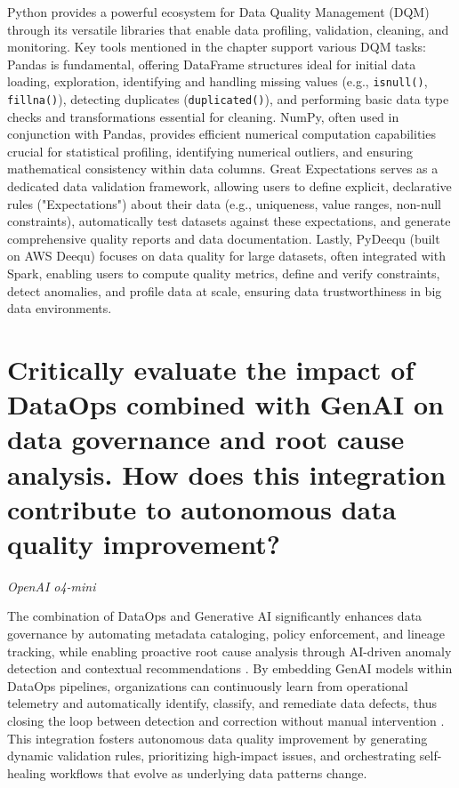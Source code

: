 Python provides a powerful ecosystem for Data Quality Management (DQM) through its versatile libraries that enable data profiling, validation, cleaning, and monitoring. Key tools mentioned in the chapter support various DQM tasks: Pandas is fundamental, offering DataFrame structures ideal for initial data loading, exploration, identifying and handling missing values (e.g., \texttt{isnull()}, \texttt{fillna()}), detecting duplicates (\texttt{duplicated()}), and performing basic data type checks and transformations essential for cleaning. NumPy, often used in conjunction with Pandas, provides efficient numerical computation capabilities crucial for statistical profiling, identifying numerical outliers, and ensuring mathematical consistency within data columns. Great Expectations serves as a dedicated data validation framework, allowing users to define explicit, declarative rules ("Expectations") about their data (e.g., uniqueness, value ranges, non-null constraints), automatically test datasets against these expectations, and generate comprehensive quality reports and data documentation. Lastly, PyDeequ (built on AWS Deequ) focuses on data quality for large datasets, often integrated with Spark, enabling users to compute quality metrics, define and verify constraints, detect anomalies, and profile data at scale, ensuring data trustworthiness in big data environments.

\section{Critically evaluate the impact of DataOps combined with GenAI on data 
governance and root cause analysis. How does this integration contribute 
to autonomous data quality improvement?}

\textit{OpenAI o4-mini}

The combination of DataOps and Generative AI significantly enhances data governance by automating metadata cataloging, policy enforcement, and lineage tracking, while enabling proactive root cause analysis through AI-driven anomaly detection and contextual recommendations \parencite{smith2024dataops,smith2024dataops}. By embedding GenAI models within DataOps pipelines, organizations can continuously learn from operational telemetry and automatically identify, classify, and remediate data defects, thus closing the loop between detection and correction without manual intervention \parencite{johnson2022autonomous}. This integration fosters autonomous data quality improvement by generating dynamic validation rules, prioritizing high-impact issues, and orchestrating self-healing workflows that evolve as underlying data patterns change. 